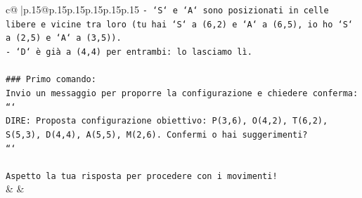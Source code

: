 \documentclass{article}
\begin{document}
{\begin{supertabular}{c@{$\;$}|p{.15\linewidth}@{}p{.15\linewidth}p{.15\linewidth}p{.15\linewidth}p{.15\linewidth}p{.15\linewidth}}
{{{\texttt{{-} `S` e `A` sono posizionati in celle libere e vicine tra loro (tu hai `S` a (6,2) e `A` a (6,5), io ho `S` a (2,5) e `A` a (3,5)).} \\
\texttt{{-} `D` è già a (4,4) per entrambi: lo lasciamo lì.} \\
\\ 
\texttt{\#\#\# Primo comando:} \\
\texttt{Invio un messaggio per proporre la configurazione e chiedere conferma:} \\
\texttt{```} \\
\texttt{DIRE: Proposta configurazione obiettivo: P(3,6), O(4,2), T(6,2), S(5,3), D(4,4), A(5,5), M(2,6). Confermi o hai suggerimenti?} \\
\texttt{```} \\
\\ 
\texttt{Aspetto la tua risposta per procedere con i movimenti!} \\
            }
        }
    }
    & & \\ \\


\end{supertabular}}
\end{document}
